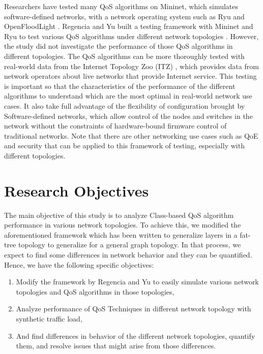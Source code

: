 Researchers have tested many QoS algorithms on Mininet, which simulates software-defined networks, with a network operating system such as Ryu and OpenFloodLight \cite{karakus_quality_2017}. Regencia and Yu built a testing framework with Mininet and Ryu to test various QoS algorithms under different network topologies \cite{yang_introducing_2022}. However, the study did not investigate the performance of those QoS algorithms in different topologies. The QoS algorithms can be more thoroughly tested with real-world data from the Internet Topology Zoo (ITZ) \cite{knight_internet_2011}, which provides data from network operators about live networks that provide Internet service. This testing is important so that the characteristics of the performance of the different algorithms to understand which are the most optimal in real-world network use cases. It also take full advantage of the flexibility of configuration brought by Software-defined networks, which allow control of the nodes and switches in the network without the constraints of hardware-bound firmware control of traditional networks. Note that there are other networking use cases such as QoE and security that can be applied to this framework of testing, especially with different topologies.

\section{Research Objectives}
The main objective of this study is to analyze Class-based QoS algorithm performance in various network topologies. To achieve this, we modified the aforementioned framework which has been written to generalize layers in a fat-tree topology to generalize for a general graph topology. In that process, we expect to find some differences in network behavior and they can be quantified. Hence, we have the following specific objectives:

\begin{enumerate}
    \item Modify the framework by Regencia and Yu to easily simulate various network topologies and QoS algorithms in those topologies,
    \item Analyze performance of QoS Techniques in different network topology with synthetic traffic load,
    \item And find differences in behavior of the different network topologies, quantify them, and resolve issues that might arise from those differences.
\end{enumerate}

